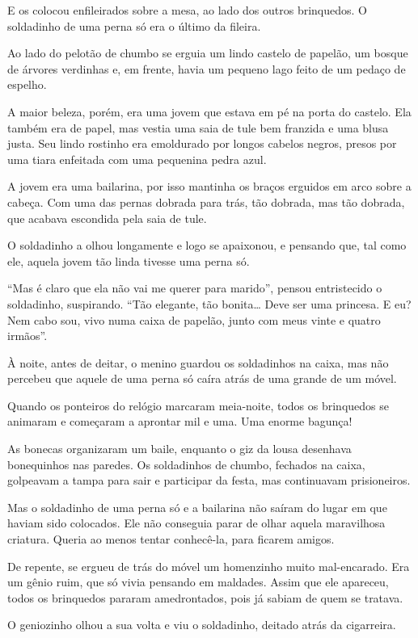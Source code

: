 \begin{conteudo}
\begin{conteudo}
\begin{conteudo}
\begin{conteudo}
\begin{conteudo}
\begin{myquote}
E os colocou enfileirados sobre a mesa, ao lado dos outros brinquedos. O
soldadinho de uma perna só era o último da fileira.

Ao lado do pelotão de chumbo se erguia um lindo castelo de papelão, um
bosque de árvores verdinhas e, em frente, havia um pequeno lago feito de
um pedaço de espelho.

A maior beleza, porém, era uma jovem que estava em pé na porta do
castelo. Ela também era de papel, mas vestia uma saia de tule bem
franzida e uma blusa justa. Seu lindo rostinho era emoldurado por
longos cabelos negros, presos por uma tiara enfeitada com uma pequenina
pedra azul.

A jovem era uma bailarina, por isso mantinha os braços erguidos
em arco sobre a cabeça. Com uma das pernas dobrada para trás, tão
dobrada, mas tão dobrada, que acabava escondida pela saia de tule.

O soldadinho a olhou longamente e logo se apaixonou, e pensando que, tal
como ele, aquela jovem tão linda tivesse uma perna só.

``Mas é claro que ela não vai me querer para marido'', pensou
entristecido o soldadinho, suspirando. ``Tão elegante, tão
bonita\ldots{} Deve ser uma princesa. E eu? Nem cabo sou, vivo numa
caixa de papelão, junto com meus vinte e quatro irmãos''.

À noite, antes de deitar, o menino guardou os soldadinhos na caixa, mas
não percebeu que aquele de uma perna só caíra atrás de uma grande de um móvel.

Quando os ponteiros do relógio marcaram meia-noite, todos os brinquedos
se animaram e começaram a aprontar mil e uma. Uma enorme bagunça!

As bonecas organizaram um baile, enquanto o giz da lousa desenhava
bonequinhos nas paredes. Os soldadinhos de chumbo, fechados na caixa,
golpeavam a tampa para sair e participar da festa, mas continuavam prisioneiros.

Mas o soldadinho de uma perna só e a bailarina não saíram do lugar em
que haviam sido colocados. Ele não conseguia parar de olhar aquela
maravilhosa criatura. Queria ao menos tentar conhecê-la, para ficarem
amigos.

De repente, se ergueu de trás do móvel um homenzinho muito mal-encarado.
Era um gênio ruim, que só vivia pensando em maldades. Assim que ele
apareceu, todos os brinquedos pararam amedrontados, pois já sabiam de
quem se tratava.

O geniozinho olhou a sua volta e viu o soldadinho, deitado atrás da
cigarreira.


\end{myquote}
\end{conteudo}
\end{conteudo}
\end{conteudo}
\end{conteudo}
\end{conteudo}
